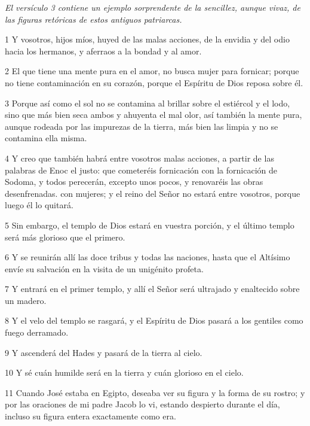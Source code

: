 \par \textit{El versículo 3 contiene un ejemplo sorprendente de la sencillez, aunque vivaz, de las figuras retóricas de estos antiguos patriarcas.}

\par 1 Y vosotros, hijos míos, huyed de las malas acciones, de la envidia y del odio hacia los hermanos, y aferraos a la bondad y al amor.

\par 2 El que tiene una mente pura en el amor, no busca mujer para fornicar; porque no tiene contaminación en su corazón, porque el Espíritu de Dios reposa sobre él.

\par 3 Porque así como el sol no se contamina al brillar sobre el estiércol y el lodo, sino que más bien seca ambos y ahuyenta el mal olor, así también la mente pura, aunque rodeada por las impurezas de la tierra, más bien las limpia y no se contamina ella misma.

\par 4 Y creo que también habrá entre vosotros malas acciones, a partir de las palabras de Enoc el justo: que cometeréis fornicación con la fornicación de Sodoma, y ​​todos perecerán, excepto unos pocos, y renovaréis las obras desenfrenadas. con mujeres; y el reino del Señor no estará entre vosotros, porque luego él lo quitará.

\par 5 Sin embargo, el templo de Dios estará en vuestra porción, y el último templo será más glorioso que el primero.

\par 6 Y se reunirán allí las doce tribus y todas las naciones, hasta que el Altísimo envíe su salvación en la visita de un unigénito profeta.

\par 7 Y entrará en el primer templo, y allí el Señor será ultrajado y enaltecido sobre un madero.

\par 8 Y el velo del templo se rasgará, y el Espíritu de Dios pasará a los gentiles como fuego derramado.

\par 9 Y ascenderá del Hades y pasará de la tierra al cielo.

\par 10 Y sé cuán humilde será en la tierra y cuán glorioso en el cielo.

\par 11 Cuando José estaba en Egipto, deseaba ver su figura y la forma de su rostro; y por las oraciones de mi padre Jacob lo vi, estando despierto durante el día, incluso su figura entera exactamente como era.

